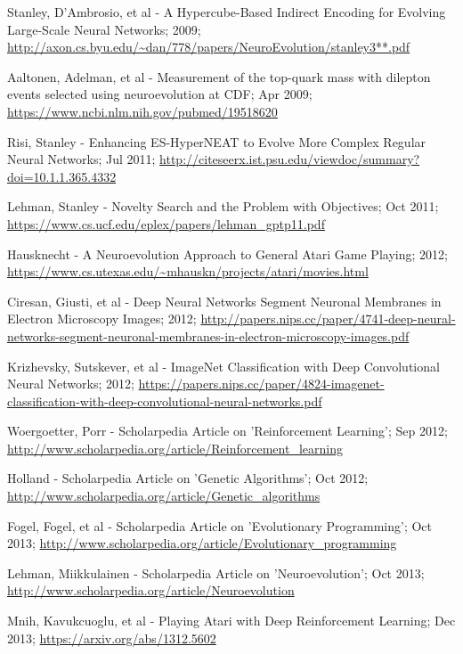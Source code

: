 \documentclass[journal, a4paper]{IEEEtran}
\begin{document}
\begin{thebibliography}{5}
    Stanley, D’Ambrosio, et al - A Hypercube-Based Indirect Encoding for Evolving Large-Scale Neural Networks; 2009;
    \url{http://axon.cs.byu.edu/~dan/778/papers/NeuroEvolution/stanley3**.pdf}

    Aaltonen, Adelman, et al - Measurement of the top-quark mass with dilepton events selected using neuroevolution at CDF; Apr 2009;
    \url{https://www.ncbi.nlm.nih.gov/pubmed/19518620}

    Risi, Stanley - Enhancing ES-HyperNEAT to Evolve More Complex Regular Neural Networks; Jul 2011;
    \url{http://citeseerx.ist.psu.edu/viewdoc/summary?doi=10.1.1.365.4332}

    Lehman, Stanley - Novelty Search and the Problem with Objectives; Oct 2011;
    \url{https://www.cs.ucf.edu/eplex/papers/lehman_gptp11.pdf}

    Hausknecht - A Neuroevolution Approach to General Atari Game Playing; 2012;
    \url{https://www.cs.utexas.edu/~mhauskn/projects/atari/movies.html}

    Ciresan, Giusti, et al - Deep Neural Networks Segment Neuronal Membranes in Electron Microscopy Images; 2012;
    \url{http://papers.nips.cc/paper/4741-deep-neural-networks-segment-neuronal-membranes-in-electron-microscopy-images.pdf}

    Krizhevsky, Sutskever, et al - ImageNet Classification with Deep Convolutional Neural Networks; 2012;
    \url{https://papers.nips.cc/paper/4824-imagenet-classification-with-deep-convolutional-neural-networks.pdf}

    Woergoetter, Porr - Scholarpedia Article on 'Reinforcement Learning'; Sep 2012;
    \url{http://www.scholarpedia.org/article/Reinforcement_learning}

    Holland - Scholarpedia Article on 'Genetic Algorithms'; Oct 2012;
    \url{http://www.scholarpedia.org/article/Genetic_algorithms}

    Fogel, Fogel, et al - Scholarpedia Article on 'Evolutionary Programming'; Oct 2013;
    \url{http://www.scholarpedia.org/article/Evolutionary_programming}

    Lehman, Miikkulainen - Scholarpedia Article on 'Neuroevolution'; Oct 2013;
    \url{http://www.scholarpedia.org/article/Neuroevolution}

    Mnih, Kavukcuoglu, et al - Playing Atari with Deep Reinforcement Learning; Dec 2013;
    \url{https://arxiv.org/abs/1312.5602}


\end{thebibliography}
\end{document}

